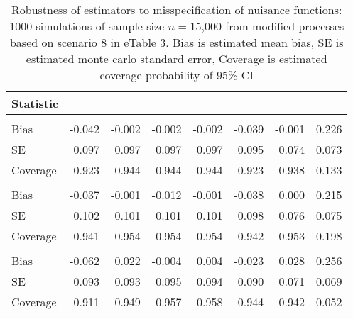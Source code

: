 \begin{appendix}
\begin{refsection}


\begin{table}[p]
    \centering
    \caption{Robustness of estimators to misspecification of nuisance functions: 1000 simulations of sample size $n=$15,000 from modified processes based on scenario 8 in eTable 3. Bias is estimated mean bias, SE is estimated monte carlo standard error, Coverage is estimated coverage probability of 95\% CI}\label{tab:sims2}
    \begin{tabular}{lddddddd}
    \toprule
    Statistic &   &   &   &  &  &  &  \\
    \midrule
    \addlinespace[0.3em]
\\
\hspace{1em}Bias & -0.042 & -0.002 & -0.002 & -0.002 & -0.039 & -0.001 & 0.226\\
\hspace{1em}SE & 0.097 & 0.097 & 0.097 & 0.097 & 0.095 & 0.074 & 0.073\\
\hspace{1em}Coverage & 0.923 & 0.944 & 0.944 & 0.944 & 0.923 & 0.938 & 0.133\\
\addlinespace[0.3em]
\\
\hspace{1em}Bias & -0.037 & -0.001 & -0.012 & -0.001 & -0.038 & 0.000 & 0.215\\
\hspace{1em}SE & 0.102 & 0.101 & 0.101 & 0.101 & 0.098 & 0.076 & 0.075\\
\hspace{1em}Coverage & 0.941 & 0.954 & 0.954 & 0.954 & 0.942 & 0.953 & 0.198\\
\addlinespace[0.3em]
\\
\hspace{1em}Bias & -0.062 & 0.022 & -0.004 & 0.004 & -0.023 & 0.028 & 0.256\\
\hspace{1em}SE & 0.093 & 0.093 & 0.095 & 0.094 & 0.090 & 0.071 & 0.069\\
\hspace{1em}Coverage & 0.911 & 0.949 & 0.957 & 0.958 & 0.944 & 0.942 & 0.052\\

\end{tabular}
\end{table}
\end{refsection}
\end{appendix}
